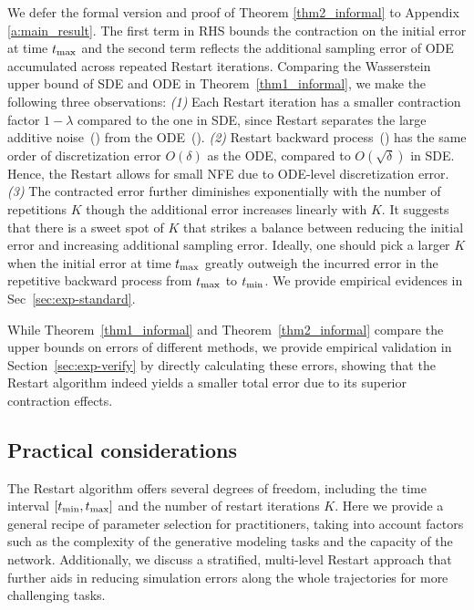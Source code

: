 We defer the formal version and proof of Theorem \ref{thm2_informal} to Appendix \ref{a:main_result}. The first term in RHS bounds the contraction on the initial error at time $t_{\textrm{max}}$ and the second term reflects the additional sampling error of ODE accumulated across repeated Restart iterations. Comparing the Wasserstein upper bound of SDE and ODE in Theorem~\ref{thm1_informal}, we make the following three observations: \textit{(1)} Each Restart iteration has a smaller contraction factor $1-\lambda$ compared to the one in SDE, since Restart separates the large additive noise~() from the ODE~(). \textit{(2)} Restart backward process~() has the same order of discretization error $O(\delta)$ as the ODE, compared to $O(\sqrt{\delta})$ in SDE. Hence, the Restart allows for small NFE due to ODE-level discretization error. \textit{(3)} The contracted error further diminishes exponentially with the number of repetitions $K$ though the additional error increases linearly with $K$. It suggests that there is a sweet spot of $K$ that strikes a balance between reducing the initial error and increasing additional sampling error. Ideally, one should pick a larger $K$ when the initial error at time $t_{\textrm{max}}$ greatly outweigh the incurred error in the repetitive backward process from $t_{\textrm{max}}$ to $t_{\textrm{min}}$. We provide empirical evidences in Sec~\ref{sec:exp-standard}.

While Theorem~\ref{thm1_informal} and Theorem~\ref{thm2_informal} compare the upper bounds on errors of different methods, we provide empirical validation in Section~\ref{sec:exp-verify} by directly calculating these errors, showing that the Restart algorithm indeed yields a smaller total error due to its superior contraction effects.

\subsection{Practical considerations}
\label{sec:practical}

The Restart algorithm offers several degrees of freedom, including the time interval $[t_{\textrm{min}}, t_{\textrm{max}}]$ and the number of restart iterations $K$. Here we provide a general recipe of parameter selection for practitioners, taking into account factors such as the complexity of the generative modeling tasks and the capacity of the network. Additionally, we discuss a stratified, multi-level Restart approach that further aids in reducing simulation errors along the whole trajectories for more challenging tasks.

